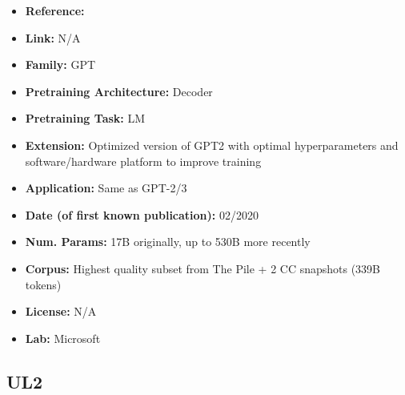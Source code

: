 \documentclass{article}
\begin{document}
            \begin{itemize}
                \item \textbf{Reference:} \href{https://www.microsoft.com/en-us/research/blog/turing-nlg-a-17-billion-parameter-language-model-by-microsoft}{}
                \item \textbf{Link:} N/A
                \item \textbf{Family:} GPT
                \item \textbf{Pretraining Architecture:} Decoder
                \item \textbf{Pretraining Task:} LM
                \item \textbf{Extension:} Optimized version of GPT2 with optimal hyperparameters and software/hardware platform to improve training
                \item \textbf{Application:} Same as GPT-2/3
                \item \textbf{Date (of first known publication):} 02/2020
                \item \textbf{Num. Params:} 17B originally, up to 530B more recently
                \item \textbf{Corpus:} Highest quality subset from The Pile + 2 CC snapshots (339B tokens)
                \item \textbf{License:} N/A
                \item \textbf{Lab:} Microsoft
            \end{itemize}

\subsection{UL2}
\end{document}
